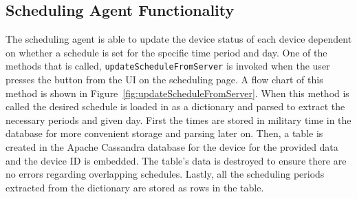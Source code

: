 \subsection{Scheduling Agent Functionality}
The scheduling agent is able to update the device status of each device dependent on whether a schedule is set for the specific time period and day. One of the methods that is called, \texttt{updateScheduleFromServer} is invoked when the user presses the  button from the UI on the scheduling page. A flow chart of this method is shown in Figure~\ref{fig:updateScheduleFromServer}. When this method is called the desired schedule is loaded in as a dictionary and parsed to extract the necessary periods and given day. First the times are stored in military time in the database for more convenient storage and parsing later on. Then, a table is created in the Apache Cassandra database for the device for the provided data and the device ID is embedded. The table's data is destroyed to ensure there are no errors regarding overlapping schedules. Lastly, all the scheduling periods extracted from the dictionary are stored as rows in the table. 
